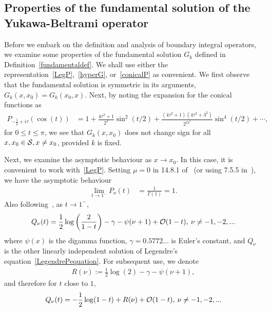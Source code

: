\subsection{Properties of the fundamental solution of the
Yukawa-Beltrami operator}
Before we embark on the definition and analysis of boundary integral
operators, we examine some properties of the fundamental solution $G_k$
defined in Definition~\ref{fundamentaldef}. We shall use either the
representation~\eqref{LegP},~\eqref{hyperG}, or~\eqref{conicalP} as
convenient.  We first observe that the fundamental solution is symmetric
in its arguments, $G_k(x,x_{0}) = G_k(x_{0},x)$. Next, by noting the
expansion for the conical functions as~\cite{lebedev}
\begin{align*}
  P_{-\frac{1}{2}+i \tau} (\cos(t)) &= 1+
    \frac{4\tau^2+1}{2^2}\sin^2(t/2) + 
      \frac{(4\tau^2+1)(4\tau^2+3^2)}{2^24^2}\sin^4(t/2) + 
    \cdots,
\end{align*}
for $0\leq t\leq \pi$, we see that $G_k(x,x_0)$ does not change sign for
  all $x,x_{0} \in \S, x \neq x_{0}$, provided $k$ is fixed.

Next, we examine the asymptotic behaviour as $x\rightarrow x_0$. In this
case, it is convenient to work with~\eqref{LegP}. Setting $\mu=0$ in
14.8.1 of~\cite{fatAbramowitz} (or using 7.5.5 in~\cite{lebedev}), we
have the asymptotic behaviour
\begin{align} 
  \label{Pasymptotics}
  \lim_{t\rightarrow 1^- } P_\nu(t)&= \frac{1}{\Gamma(1)}=1.
\end{align}
Also following~\cite{fatAbramowitz}, as $t\rightarrow 1^{-}$,
\begin{align*}
  Q_{\nu}(t)=\frac{1}{2}\log\left(\frac{2}{1-t}\right)-\gamma
  -\psi(\nu+1)+\bigO(1-t),\: \nu \neq -1,-2,...
\end{align*} 
where $\psi(x)$ is the digamma function, $\gamma=0.5772\ldots$ is
Euler's constant, and $Q_{\nu}$ is the other linearly independent
solution of Legendre's equation~\eqref{LegendrePequation}.  For
subsequent use, we denote 
\begin{align*}
  R(\nu):= \frac{1}{2}\log(2) -\gamma -\psi(\nu+1), 
\end{align*}
and therefore for $t$ close to $1$,
\begin{equation}
  \label{Qasymptotics}
  Q_{\nu}(t)=-\frac{1}{2}\log(1-t) + 
  R(\nu) + \bigO(1-t),\: \nu \neq -1,-2,... 
\end{equation}


